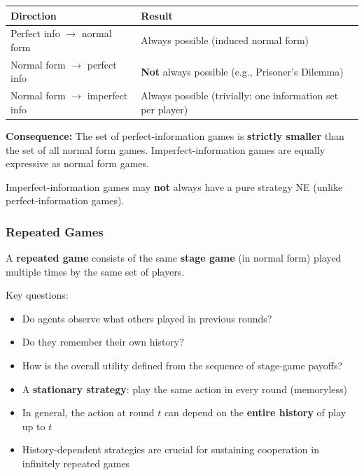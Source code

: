 \begin{tipbox}
\begin{center}
\renewcommand{\arraystretch}{1.3}
\begin{tabular}{@{} l p{9cm} @{}}
\toprule
\textbf{Direction} & \textbf{Result} \\
\midrule
Perfect info $\to$ normal form & Always possible (induced normal form) \\
Normal form $\to$ perfect info & \textbf{Not} always possible (e.g., Prisoner's Dilemma) \\
Normal form $\to$ imperfect info & Always possible (trivially: one information set per player) \\
\bottomrule
\end{tabular}
\end{center}

\textbf{Consequence:} The set of perfect-information games is \textbf{strictly smaller} than the set of all normal form games. Imperfect-information games are equally expressive as normal form games.

Imperfect-information games may \textbf{not} always have a pure strategy NE (unlike perfect-information games).
\end{tipbox}

\bigseparator

\subsubsection{Repeated Games}

\begin{defbox}
A \textbf{repeated game} consists of the same \textbf{stage game} (in normal form) played multiple times by the same set of players.

Key questions:
\begin{itemize}
  \item Do agents observe what others played in previous rounds?
  \item Do they remember their own history?
  \item How is the overall utility defined from the sequence of stage-game payoffs?
\end{itemize}
\end{defbox}

\begin{defbox}
\begin{itemize}
  \item A \textbf{stationary strategy}: play the same action in every round (memoryless)
  \item In general, the action at round $t$ can depend on the \textbf{entire history} of play up to $t$
  \item History-dependent strategies are crucial for sustaining cooperation in infinitely repeated games
\end{itemize}
\end{defbox}

